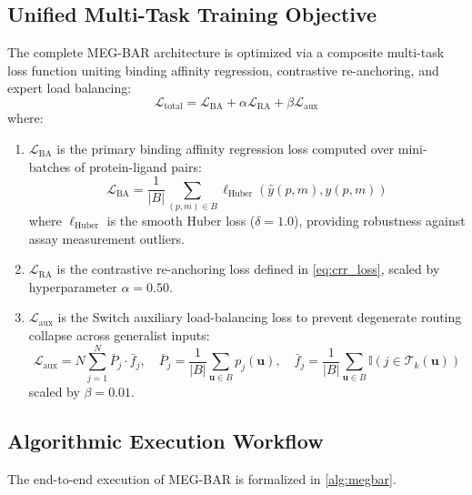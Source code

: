 \documentclass{article}
\theoremstyle{definition}
\begin{document}
\subsection{Unified Multi-Task Training Objective}
The complete MEG-BAR architecture is optimized via a composite multi-task loss function uniting binding affinity regression, contrastive re-anchoring, and expert load balancing:
\begin{equation}
\mathcal{L}_{\text{total}} = \mathcal{L}_{\text{BA}} + \alpha \mathcal{L}_{\text{RA}} + \beta \mathcal{L}_{\text{aux}}
\label{eq:total_loss}
\end{equation}
where:
\begin{enumerate}[leftmargin=1.5em,noitemsep]
    \item $\mathcal{L}_{\text{BA}}$ is the primary binding affinity regression loss computed over mini-batches of protein-ligand pairs:
    \begin{equation}
    \mathcal{L}_{\text{BA}} = \frac{1}{|B|} \sum_{(p, m) \in B} \ell_{\text{Huber}}(\hat{y}(p, m), y(p, m))
    \end{equation}
    where $\ell_{\text{Huber}}$ is the smooth Huber loss ($\delta = 1.0$), providing robustness against assay measurement outliers.
    \item $\mathcal{L}_{\text{RA}}$ is the contrastive re-anchoring loss defined in \cref{eq:crr_loss}, scaled by hyperparameter $\alpha = 0.50$.
    \item $\mathcal{L}_{\text{aux}}$ is the Switch auxiliary load-balancing loss \citep{fedus2022switch} to prevent degenerate routing collapse across generalist inputs:
    \begin{equation}
    \mathcal{L}_{\text{aux}} = N \sum_{j=1}^N \bar{P}_j \cdot \bar{f}_j, \quad \bar{P}_j = \frac{1}{|B|} \sum_{\mathbf{u} \in B} p_j(\mathbf{u}), \quad \bar{f}_j = \frac{1}{|B|} \sum_{\mathbf{u} \in B} \mathbb{I}(j \in \mathcal{T}_k(\mathbf{u}))
    \end{equation}
    scaled by $\beta = 0.01$.
\end{enumerate}

\subsection{Algorithmic Execution Workflow}
The end-to-end execution of MEG-BAR is formalized in \cref{alg:megbar}.
\end{document}
